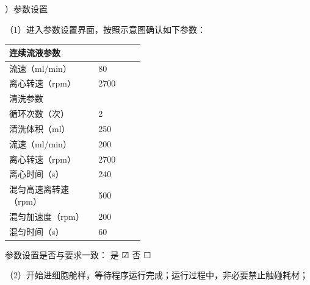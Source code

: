 \documentclass[UTF8,10pt,a4paper,fontset=fandol]{ctexart}
\newcommand{\fieldvalue}[1]{#1}
\newcommand{\handwritten}[1]{#1}
\newcommand{\checkboxfield}[1]{\ifstrequal{#1}{checked}{☑}{\ifstrequal{#1}{unclear}{?}{☐}}}
\begin{document}
\medskip

）参数设置

\noindent
（1）进入参数设置界面，按照示意图确认如下参数：

\begin{center}
\begin{tabular}{|p{0.28\linewidth}|p{0.16\linewidth}|}
\hline
连续流液参数 & \\ \hline
流速（ml/min） &
\fieldvalue{80}
\\ \hline
离心转速（rpm） &
\fieldvalue{2700}
\\ \hline
清洗参数 & \\ \hline
循环次数（次） &
\fieldvalue{2}
\\ \hline
清洗体积（ml） &
\fieldvalue{250}
\\ \hline
流速（ml/min） &
\fieldvalue{200}
\\ \hline
离心转速（rpm） &
\fieldvalue{2700}
\\ \hline
离心时间（s） &
\fieldvalue{240}
\\ \hline
混匀高速离转速（rpm） &
\fieldvalue{500}
\\ \hline
混匀加速度（rpm） &
\fieldvalue{200}
\\ \hline
混匀时间（s） &
\fieldvalue{60}
\\ \hline
\end{tabular}
\end{center}

\noindent
参数设置是否与要求一致：
是
\fieldvalue{\handwritten{\checkboxfield{checked}}}
\quad
否
\fieldvalue{\checkboxfield{unchecked}}

\medskip

\noindent
（2）开始进细胞舱样，等待程序运行完成；运行过程中，非必要禁止触碰耗材；
\end{document}
